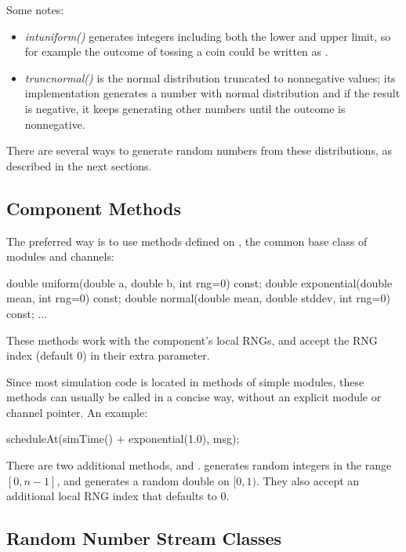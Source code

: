 Some notes:

\begin{itemize}
\item \textit{intuniform()} generates integers including both the lower and upper
    limit, so for example the outcome of tossing a coin could be written as
    .
\item \textit{truncnormal()} is the normal distribution truncated to nonnegative
    values; its implementation generates a number with normal distribution and
    if the result is negative, it keeps generating other numbers until the
    outcome is nonnegative.
\end{itemize}

There are several ways to generate random numbers from these distributions,
as described in the next sections.

\subsection{Component Methods}
\label{sec:sim-lib:random-variate-component-methods}

The preferred way is to use methods defined on , the
common base class of modules and channels:

\begin{cpp}
double uniform(double a, double b, int rng=0) const;
double exponential(double mean, int rng=0) const;
double normal(double mean, double stddev, int rng=0) const;
...
\end{cpp}

These methods work with the component's local RNGs, and accept the RNG
index (default 0) in their extra  parameter.

Since most simulation code is located in methods of simple modules, these
methods can usually be called in a concise way, without an explicit module
or channel pointer. An example:

\begin{cpp}
scheduleAt(simTime() + exponential(1.0), msg);
\end{cpp}

There are two additional methods,  and .
 generates random integers in the range $[0, n-1]$, and
 generates a random double on $[0,1)$. They also accept
an additional local RNG index that defaults to 0.

\subsection{Random Number Stream Classes}
\label{sec:sim-lib:random-number-stream-classes}


